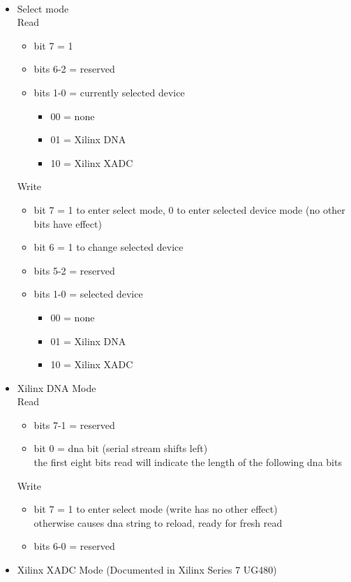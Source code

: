 \\
\begin{itemize}
\item Select mode\\
Read
\begin{itemize}
\item bit 7 = 1
\item bits 6-2 = reserved
\item bits 1-0 = currently selected device
\begin{itemize}
\item[] 00 = none
\item[] 01 = Xilinx DNA
\item[] 10 = Xilinx XADC
\end{itemize}
\end{itemize}
Write
\begin{itemize}
\item bit 7 = 1 to enter select mode, 0 to enter selected device mode (no other bits have effect)
\item bit 6 = 1 to change selected device
\item bits 5-2 = reserved
\item bits 1-0 = selected device
\begin{itemize}
\item[] 00 = none
\item[] 01 = Xilinx DNA
\item[] 10 = Xilinx XADC
\end{itemize}
\end{itemize}
\item Xilinx DNA Mode\\
Read
\begin{itemize}
\item bits 7-1 = reserved
\item bit 0 = dna bit (serial stream shifts left)\\
the first eight bits read will indicate the length of the following
dna bits
\end{itemize}
Write
\begin{itemize}
\item bit 7 = 1 to enter select mode (write has no other effect)\\
otherwise causes dna string to reload, ready for fresh read
\item bits 6-0 = reserved
\end{itemize}
\item Xilinx XADC Mode (Documented in Xilinx Series 7 UG480)\\

\end{itemize}
